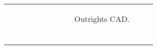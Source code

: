 \documentclass[a4paper,twoside]{report}
\begin{document}
 
\begin{figure}[htbp]
 \begin{tabular}[c]{cc}
 \begin{subfigure}[c]{0.5\textwidth}
 
 \end{subfigure}&
 \begin{subfigure}[c]{0.5\textwidth}
 \caption{Outrights CAD.}
 \label{fig:Outrights CAD}
 
 \null\hfill 
 \end{subfigure}\\
 
 
 \begin{subfigure}[c]{0.5\textwidth}
 
 \null\hfill
 \end{subfigure}&
 

\end{tabular}
\end{figure}
\end{document}
